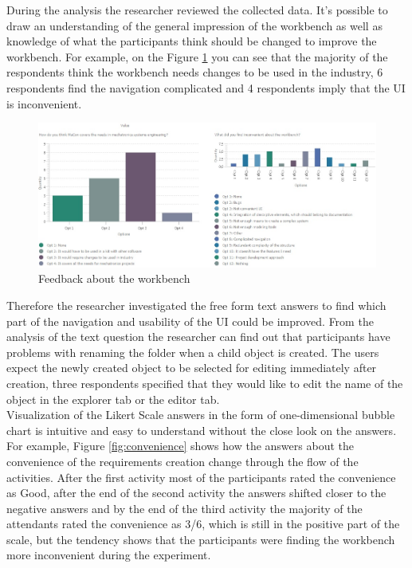 During the analysis the researcher reviewed the collected data. It's possible to draw an understanding of the general impression of the workbench as well as knowledge of what the participants think should be changed to improve the workbench. For example, on the Figure \ref{fig:results1} you can see that the majority of the respondents think the workbench needs changes to be used in the industry, 6 respondents find the navigation complicated and 4 respondents imply that the UI is inconvenient.\\ 

\begin{figure}[htb]
 \centering
\includegraphics[width=\textwidth]{figures/results1.jpg}
\caption{Feedback about the workbench}
\label{fig:results1}
\end{figure}

Therefore the researcher investigated the free form text answers to find which part of the navigation and usability of the UI could be improved. From the analysis of the text question the researcher can find out that participants have problems with renaming the folder when a child object is created. The users expect the newly created object to be selected for editing immediately after creation, three respondents specified that they would like to edit the name of the object in the explorer tab or the editor tab.\\

Visualization of the Likert Scale answers in the form of one-dimensional bubble chart is intuitive and easy to understand without the close look on the answers. For example, Figure \ref{fig:convenience} shows how the answers about the convenience of the requirements creation change through the flow of the activities. After the first activity most of the participants rated the convenience as Good, after the end of the second activity the answers shifted closer to the negative answers and by the end of the third activity the majority of the attendants rated the convenience as 3/6, which is still in the positive part of the scale, but the tendency shows that the participants were finding the workbench more inconvenient during the experiment.\\     

